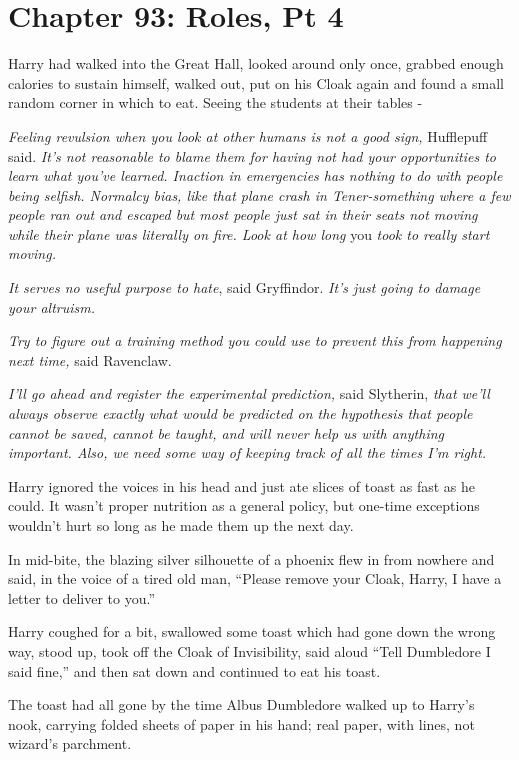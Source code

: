 \chapter{Chapter 93: Roles, Pt 4}
Harry had walked into the Great Hall, looked around only once, grabbed enough calories to sustain himself, walked out, put on his Cloak again and found a small random corner in which to eat. Seeing the students at their tables -

\emph{Feeling revulsion when you look at other humans is not a good sign,} Hufflepuff said. \emph{It's not reasonable to blame them for having not had your opportunities to learn what you've learned. Inaction in emergencies has nothing to do with people being selfish. Normalcy bias, like that plane crash in Tener-something where a few people ran out and escaped but most people just sat in their seats not moving while their plane was literally on fire. Look at how long} you \emph{took to really start moving.}

\emph{It serves no useful purpose to hate}, said Gryffindor. \emph{It's just going to damage your altruism.}

\emph{Try to figure out a training method you could use to prevent this from happening next time,} said Ravenclaw.

\emph{I'll go ahead and register the experimental prediction,} said Slytherin, \emph{that we'll always observe exactly what would be predicted on the hypothesis that people cannot be saved, cannot be taught, and will never help us with anything important. Also, we need some way of keeping track of all the times I'm right.}

Harry ignored the voices in his head and just ate slices of toast as fast as he could. It wasn't proper nutrition as a general policy, but one-time exceptions wouldn't hurt so long as he made them up the next day.

In mid-bite, the blazing silver silhouette of a phoenix flew in from nowhere and said, in the voice of a tired old man, ``Please remove your Cloak, Harry, I have a letter to deliver to you.''

Harry coughed for a bit, swallowed some toast which had gone down the wrong way, stood up, took off the Cloak of Invisibility, said aloud ``Tell Dumbledore I said fine,'' and then sat down and continued to eat his toast.

The toast had all gone by the time Albus Dumbledore walked up to Harry's nook, carrying folded sheets of paper in his hand; real paper, with lines, not wizard's parchment.

